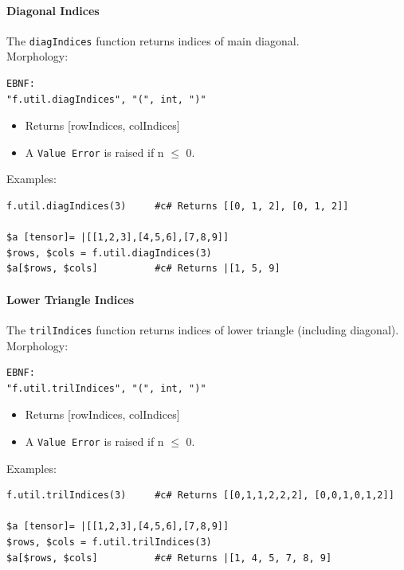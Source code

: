 \paragraph{Diagonal Indices}
The \texttt{diagIndices} function returns indices of main diagonal.\\
Morphology:
\begin{verbatim}
EBNF:
"f.util.diagIndices", "(", int, ")"
\end{verbatim}
\begin{itemize}
\item Returns [rowIndices, colIndices]
\item A \texttt{Value Error} is raised if n $\leq$ 0.
\end{itemize}
Examples:
\begin{verbatim}
f.util.diagIndices(3)     #c# Returns [[0, 1, 2], [0, 1, 2]]

$a [tensor]= |[[1,2,3],[4,5,6],[7,8,9]]
$rows, $cols = f.util.diagIndices(3)
$a[$rows, $cols]          #c# Returns |[1, 5, 9]
\end{verbatim}

\paragraph{Lower Triangle Indices}
The \texttt{trilIndices} function returns indices of lower triangle (including diagonal).\\
Morphology:
\begin{verbatim}
EBNF:
"f.util.trilIndices", "(", int, ")"
\end{verbatim}
\begin{itemize}
\item Returns [rowIndices, colIndices]
\item A \texttt{Value Error} is raised if n $\leq$ 0.
\end{itemize}
Examples:
\begin{verbatim}
f.util.trilIndices(3)     #c# Returns [[0,1,1,2,2,2], [0,0,1,0,1,2]]

$a [tensor]= |[[1,2,3],[4,5,6],[7,8,9]]
$rows, $cols = f.util.trilIndices(3)
$a[$rows, $cols]          #c# Returns |[1, 4, 5, 7, 8, 9]
\end{verbatim}

